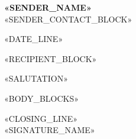 \documentclass[11pt]{article}
\begin{document}
\thispagestyle{empty}

{\bfseries\large\color{accent} «SENDER_NAME»}\\
{\small\color{textmuted} «SENDER_CONTACT_BLOCK»}

«DATE_LINE»

«RECIPIENT_BLOCK»

«SALUTATION»

«BODY_BLOCKS»

«CLOSING_LINE»\\[2\baselineskip]
«SIGNATURE_NAME»
\end{document}

